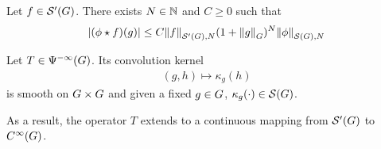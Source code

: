 \begin{lemma}
\label{lemma:continuity_of_convolutions}
    Let $f \in \TemperedDistributions \Group$.
    There exists $N \in \N$ and $C \geq 0$ such that
    \begin{align*}
        \abs {(\conv \phi f)(g)}
        \leq
        C
        \seminorm [\TemperedDistributions \Group] N f
        (1 + \norm [\Group] g)^N
        \seminorm [\Schwartz \Group] N \phi
    \end{align*}
\end{lemma}

\begin{proposition}
    Let $T \in \SmoothingOperators$.
    Its convolution kernel
    \begin{align*}
        (g, h) \mapsto \kappa_g(h)
    \end{align*}
    is smooth on $\Group \times \Group$ and given a fixed $g \in \Group$, $\kappa_g(\dummy) \in \Schwartz \Group$.

    As a result,
    the operator $T$ extends to a continuous mapping from $\TemperedDistributions \Group$ to $\SmoothFunctions \Group$.
\end{proposition}
